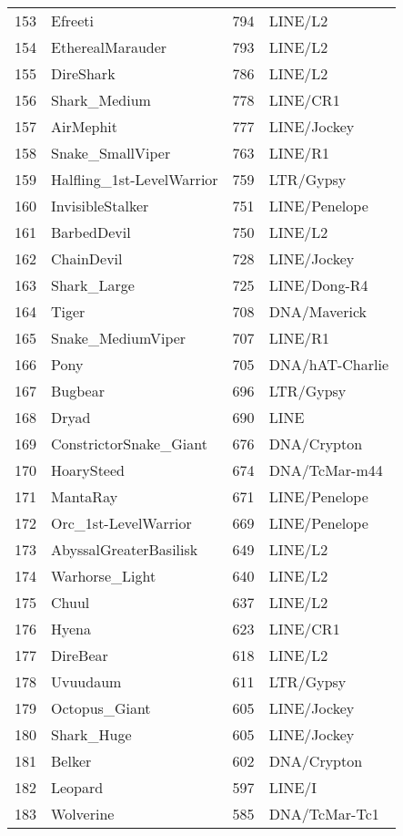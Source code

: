\begin{table}[ht]
\begin{tabular}{rlrl}
  153 & Efreeti & 794 & LINE/L2  \\ 
  154 & EtherealMarauder & 793 & LINE/L2  \\ 
  155 & DireShark & 786 & LINE/L2  \\ 
  156 & Shark\_Medium & 778 & LINE/CR1  \\ 
  157 & AirMephit & 777 & LINE/Jockey  \\ 
  158 & Snake\_SmallViper & 763 & LINE/R1  \\ 
  159 & Halfling\_1st-LevelWarrior & 759 & LTR/Gypsy  \\ 
  160 & InvisibleStalker & 751 & LINE/Penelope  \\ 
  161 & BarbedDevil & 750 & LINE/L2  \\ 
  162 & ChainDevil & 728 & LINE/Jockey  \\ 
  163 & Shark\_Large & 725 & LINE/Dong-R4  \\ 
  164 & Tiger & 708 & DNA/Maverick  \\ 
  165 & Snake\_MediumViper & 707 & LINE/R1  \\ 
  166 & Pony & 705 & DNA/hAT-Charlie  \\ 
  167 & Bugbear & 696 & LTR/Gypsy  \\ 
  168 & Dryad & 690 & LINE  \\ 
  169 & ConstrictorSnake\_Giant & 676 & DNA/Crypton  \\ 
  170 & HoarySteed & 674 & DNA/TcMar-m44  \\ 
  171 & MantaRay & 671 & LINE/Penelope  \\ 
  172 & Orc\_1st-LevelWarrior & 669 & LINE/Penelope  \\ 
  173 & AbyssalGreaterBasilisk & 649 & LINE/L2  \\ 
  174 & Warhorse\_Light & 640 & LINE/L2  \\ 
  175 & Chuul & 637 & LINE/L2  \\ 
  176 & Hyena & 623 & LINE/CR1  \\ 
  177 & DireBear & 618 & LINE/L2  \\ 
  178 & Uvuudaum & 611 & LTR/Gypsy  \\ 
  179 & Octopus\_Giant & 605 & LINE/Jockey  \\ 
  180 & Shark\_Huge & 605 & LINE/Jockey  \\ 
  181 & Belker & 602 & DNA/Crypton  \\ 
  182 & Leopard & 597 & LINE/I  \\ 
  183 & Wolverine & 585 & DNA/TcMar-Tc1  \\ 

\end{tabular}
\end{table}
